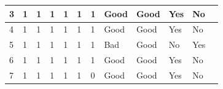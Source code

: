 \begin{table}[H]
\begin{tabular}{|l|l|l|l|l|l|l|l|l|l|l|l|}
3                                                           & 1  & 1    & 1   & 1     & 1    & 1                                                                     & Good                                                    & Good                                                     & Yes                                                                   & No                                                                    &                                                                       \\ \hline
4                                                           & 1  & 1    & 1   & 1     & 1    & 1                                                                     & Good                                                    & Good                                                     & Yes                                                                   & No                                                                    &                                                                       \\ \hline
5                                                           & 1  & 1    & 1   & 1     & 1    & 1                                                                     & Bad                                                     & Good                                                     & No                                                                    & Yes                                                                   &                                                                       \\ \hline
6                                                           & 1  & 1    & 1   & 1     & 1    & 1                                                                     & Good                                                    & Good                                                     & Yes                                                                   & No                                                                    &                                                                       \\ \hline
7                                                           & 1  & 1    & 1   & 1     & 1    & 0                                                                     & Good                                                    & Good                                                     & Yes                                                                   & No                                                                    &                                                                       \\ \hline

\end{tabular}
\end{table}
